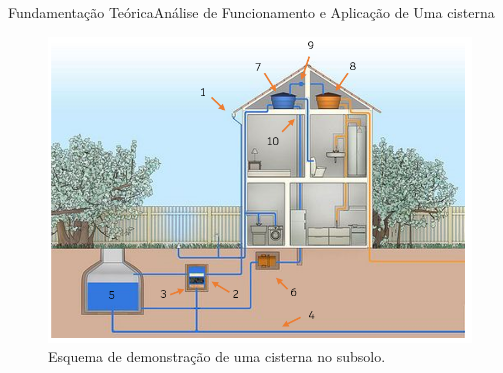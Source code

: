 \begin{frame}{Fundamentação Teórica}{Análise de Funcionamento e Aplicação de Uma cisterna}

\vspace{-1}
\begin{itemize}
\end{itemize}


\vspace{-0.64}
\begin{figure}[htp]
	\centering
	\caption{\small{Esquema de demonstração de uma cisterna no subsolo.}}
	\label{figura01}
	\includegraphics[width=0.5\linewidth]{figuras/esquema_cisterna.png}
    \hspace{5cm}
\end{figure}
    
\end{frame}

